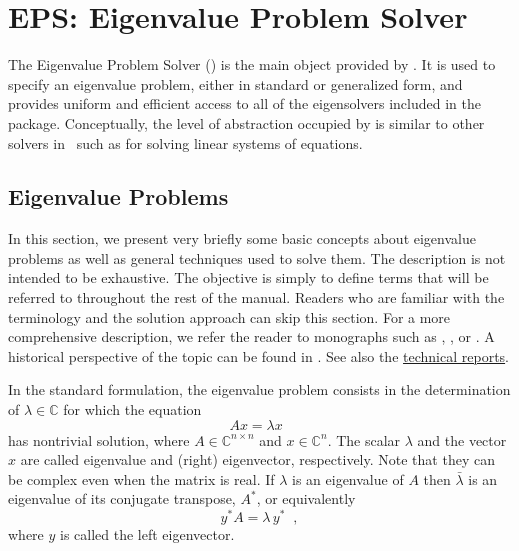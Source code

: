 \chapter{\label{cap:eps}EPS: Eigenvalue Problem Solver}

\noindent The Eigenvalue Problem Solver () is the main object provided by \slepc. It is used to specify an eigenvalue problem, either in standard or generalized form, and provides uniform and efficient access to all of the eigensolvers included in the package. Conceptually, the level of abstraction occupied by  is similar to other solvers in \petsc\ such as  for solving linear systems of equations.
	
\section{\label{sec:eig}Eigenvalue Problems}

	In this section, we present very briefly some basic concepts about eigenvalue problems as well as general techniques used to solve them. The description is not intended to be exhaustive. The objective is simply to define terms that will be referred to throughout the rest of the manual. Readers who are familiar with the terminology and the solution approach can skip this section. For a more comprehensive description, we refer the reader to monographs such as \citep{Stewart:2001:MAV}, \citep{Bai:2000:TSA}, \citep{Saad:1992:NML} or \citep{Parlett:1980:SEP}. A historical perspective of the topic can be found in \citep{Golub:2000:EC2}. See also the \slepc \hyperlink{str}{technical reports}.

In the standard formulation, the eigenvalue problem consists in the determination of $\lambda\in\mathbb{C}$ for which the equation
\begin{equation}
Ax=\lambda x\;\;\label{eq:eigstd}
\end{equation}
has nontrivial solution, where $A\in\mathbb{C}^{n\times n}$ and $x\in\mathbb{C}^n$. The scalar $\lambda$ and the vector $x$ are called eigenvalue and (right) eigenvector, respectively. Note that they can be complex even when the matrix is real. If $\lambda$ is an eigenvalue of $A$ then $\bar{\lambda}$ is an eigenvalue of its conjugate transpose, $A^*$, or equivalently
\begin{equation}
y^*\!A=\lambda\, y^*\;\;,\label{eq:eigstdleft}
\end{equation}
where $y$ is called the left eigenvector.

